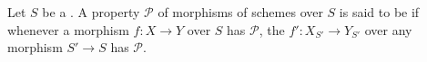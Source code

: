 \begin{definition} \label{definition:property_of_a_morphism_of_schemes_over_a_scheme_preserved_under_base_change}
    Let $S$ be a . A property $\mathcal{P}$ of morphisms of schemes over $S$ is said to be  if whenever a morphism $f: X \to Y$ over $S$ has $\mathcal{P}$, the  $f': X_{S'} \to Y_{S'}$ over any morphism $S' \to S$ has $\mathcal{P}$.
\end{definition}